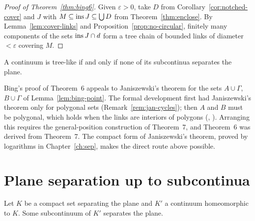 
\begin{proof}[Proof of Theorem~\ref{thm:bing6}]
Given $\varepsilon>0$, take $D$ from Corollary~\ref{cor:notched-cover} and $J$ with $M\subseteq\operatorname{ins}
J\subseteq\bigcup D$ from Theorem~\ref{thm:enclose}. By Lemma~\ref{lem:cover-links} and
Proposition~\ref{prop:no-circular}, finitely many components of the sets $\operatorname{ins} J\cap d$ form a tree
chain of bounded links of diameter $<\varepsilon$ covering $M$.
\end{proof}


\begin{corollary}\label{cor:treelike-iff}
A continuum is tree-like if and only if none of its subcontinua separates the plane.
\end{corollary}


\begin{remark}
Bing's proof of Theorem~6 appeals to Janiszewski's theorem for the sets $A\cup\Gamma$, $B\cup\Gamma$ of
Lemma~\ref{lem:bing-point}. The formal development first had Janiszewski's theorem only for polygonal
sets (Remark~\ref{rem:jan-cycles}); then $A$ and $B$ must be polygonal, which holds when the links are
interiors of polygons (, ).
Arranging this requires the general-position construction of Theorem~7, and Theorem~6 was derived
from Theorem~7. The compact form of Janiszewski's theorem, proved by logarithms in
Chapter~\ref{ch:sep}, makes the direct route above possible.
\end{remark}

\section{Plane separation up to subcontinua}\label{sec:weak-invariance}

\begin{theorem}\label{thm:weak-invariance}
Let $K$ be a compact set separating the plane and $K'$ a continuum homeomorphic to $K$. Some
subcontinuum of $K'$ separates the plane.
\end{theorem}

